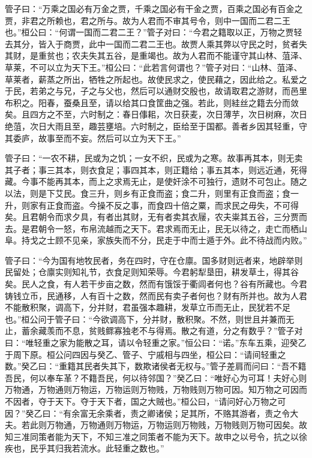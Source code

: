 \documentclass[]{article}
\begin{document}
管子曰：``万乘之国必有万金之贾，千乘之国必有干金之贾，百乘之国必有百金之贾，非君之所赖也，君之所与。故为人君而不审其号令，则中一国而二君二王也。''桓公曰：``何谓一国而二君二王？''管子对曰：``今君之籍取以正，万物之贾轻去其分，皆入于商贾，此中一国而二君二王也。故贾人乘其弊以守民之时，贫者失其财，是重贫也；农夫失其五谷，是重竭也。故为人君而不能谨守其山林、菹泽、草莱，不可以立为天下王。''桓公曰：``此若言何谓也？''管子对曰：``山林、菹泽、草莱者，薪蒸之所出，牺牲之所起也。故使民求之，使民藉之，因此给之。私爱之于民，若弟之与兄，子之与父也，然后可以通财交殷也，故请取君之游财，而邑里布积之。阳春，蚕桑且至，请以给其口食筐曲之强。若此，则絓丝之籍去分而敛矣。且四方之不至，六时制之：春日倳耜，次日获麦，次日薄芋，次日树麻，次日绝菹，次日大雨且至，趣芸壅培。六时制之，臣给至于国都。善者乡因其轻重，守其委庐，故事至而不妄。然后可以立为天下王。''

管子曰：``一农不耕，民或为之饥；一女不织，民或为之寒。故事再其本，则无卖其子者；事三其本，则衣食足；事四其本，则正籍给；事五其本，则远近通，死得藏。今事不能再其本，而上之求焉无止，是使奸涂不可独行，遗财不可包止。随之以法，则是下艾民。食三升，则乡有正食而盗；食二升，则里有正食而盗；食一升，则家有正食而盗。今操不反之事，而食四十倍之粟，而求民之毋失，不可得矣。且君朝令而求夕具，有者出其财，无有者卖其衣屦，农夫粜其五谷，三分贾而去。是君朝令一怒，布帛流越而之天下。君求焉而无止，民无以待之，走亡而栖山阜。持戈之士顾不见亲，家族失而不分，民走于中而士遁于外。此不待战而内败。''

管子曰：``今为国有地牧民者，务在四时，守在仓廪。国多财则远者来，地辟举则民留处；仓廪实则知礼节，衣食足则知荣辱。今君躬犁垦田，耕发草土，得其谷矣。民人之食，有人若干步亩之数，然而有饿馁于衢闾者何也？谷有所藏也。今君铸钱立币，民通移，人有百十之数，然而民有卖子者何也？财有所并也。故为人君不能散积聚，调高下，分并财，君虽强本趣耕，发草立币而无止，民犹若不足也。''桓公问于管子曰：``今欲调高下，分并财，散积聚。不然，则世且并兼而无止，蓄余藏羡而不息，贫贱鳏寡独老不与得焉。散之有道，分之有数乎？''管子对曰：``唯轻重之家为能散之耳，请以令轻重之家。''恒公曰：``诺。''东车五乘，迎癸乙于周下原。桓公问四因与癸乙、管子、宁戚相与四坐，桓公曰：``请间轻重之数。''癸乙曰：``重籍其民者失其下，数欺诸侯者无权与。''管子差肩而问曰：``吾不籍吾民，何以奉车革？不籍吾民，何以待邻国？''癸乙曰：``唯好心为可耳！夫好心则万物通，万物通则万物运，万物运则万物贱，万物贱则万物可因。知万物之可因而不因者，夺于天下。夺于天下者，国之大贼也。''桓公曰，``请问好心万物之可因？''癸乙曰：``有余富无余乘者，责之卿诸侯；足其所，不赂其游者，责之令大夫。若此则万物通，万物通则万物运，万物运则万物贱，万物贱则万物可因矣。故知三准同策者能为天下，不知三准之同策者不能为天下。故申之以号令，抗之以徐疾也，民乎其归我若流水。此轻重之数也。''
\end{document}
